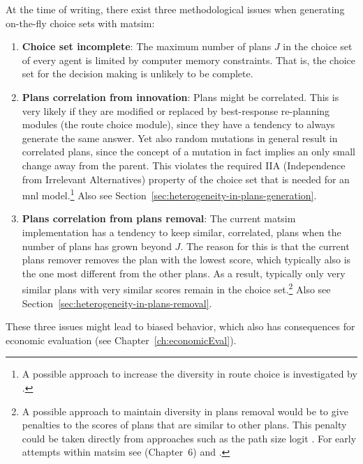 At the time of writing, there exist three methodological issues when generating on-the-fly choice sets with \acrshort{matsim}:
%
\begin{enumerate}\styleEnumerate
\item \textbf{Choice set incomplete}: The maximum number of plans $J$ in the choice set of every agent is limited by computer memory constraints. That is, the choice set for the decision making is unlikely to be complete.
%
\item \textbf{Plans correlation from innovation}: Plans might be correlated. This is very likely if they are modified or replaced by best-response re-planning modules (\eg the route choice module), since they have a tendency to always generate the same answer. Yet also random mutations in general result in correlated plans, since the concept of a mutation in fact implies an only small change away from the parent.  This violates the required IIA (Independence from Irrelevant Alternatives) 
property of the choice set that is needed for an \gls{mnl} 
model.\footnote{%
%
A possible approach to increase the diversity in route choice is investigated by \citet{NagelKickhoeferJoubert2014HeterogeneousVoTsPROCEDIA}.
%
} Also see Section~\ref{sec:heterogeneity-in-plans-generation}.

\item \textbf{Plans correlation from plans removal}: The current \acrshort{matsim} implementation has a tendency to keep similar, \ie  correlated, plans when the number of plans has grown beyond $J$.  The reason for this is that the current plans remover removes the plan with the lowest score, which typically also is the one most different from the other plans.  As a result, typically only very similar plans with very similar scores remain in the choice set.\footnote{%
%
A possible approach to maintain diversity in plans removal would be to give penalties to the scores of plans that are similar to other plans.  This penalty could be taken directly from approaches such as the path size logit \citep{DaganzoSheffi1977SUE,FrejingerBierlaire2007PathSizeLogit}.  For early attempts within \acrshort{matsim} see \cite{Grether2014PhD} (Chapter~6) and \cite{NeumannEtAlPassengerArrivalPatterns}.
%
} Also see Section~\ref{sec:heterogeneity-in-plans-removal}.
%
\end{enumerate}
%
These three issues might lead to biased behavior, which also has consequences for economic evaluation (see Chapter~\ref{ch:economicEval}).

